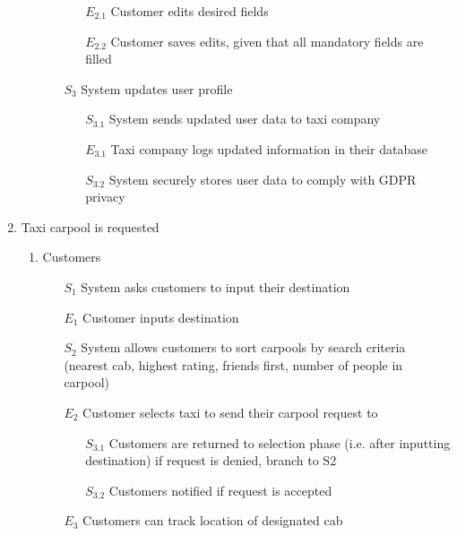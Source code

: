 \documentclass[]{article}
\begin{document}
\begin{enumerate}[{\textbf{BE}}1.]
\begin{enumerate}[{VP2}.1]
\begin{enumerate}
                \begin{enumerate}
                    \item[$E_{2.1}$] Customer edits desired fields
                    \item[$E_{2.2}$] Customer saves edits, given that all mandatory fields are filled
                \end{enumerate}
                \item[$S_3$] System updates user profile
                \begin{enumerate}
                    \item[$S_{3.1}$] System sends updated user data to taxi company
                    \item[$E_{3.1}$] Taxi company logs updated information in their database
                    \item[$S_{3.2}$] System securely stores user data to comply with GDPR privacy
                \end{enumerate}
            \end{enumerate}
    \end{enumerate}
    \item Taxi carpool is requested
    \begin{enumerate}[{VP3}.1]
        \item Customers
            \begin{enumerate}
                \item[$S_1$] System asks customers to input their destination
                \item[$E_1$] Customer inputs destination
                \item[$S_2$] System allows customers to sort carpools by search criteria (nearest cab, highest rating, friends first, number of people in carpool)
                \item[$E_2$] Customer selects taxi to send their carpool request to
                \begin{enumerate}
                    \item[$S_{3.1}$] Customers are returned to selection phase (i.e. after inputting destination) if request is denied, branch to S2
                    \item[$S_{3.2}$] Customers notified if request is accepted
                \end{enumerate}
                \item[$E_3$] Customers can track location of designated cab
            \end{enumerate}

\end{enumerate}
\end{enumerate}
\end{document}
